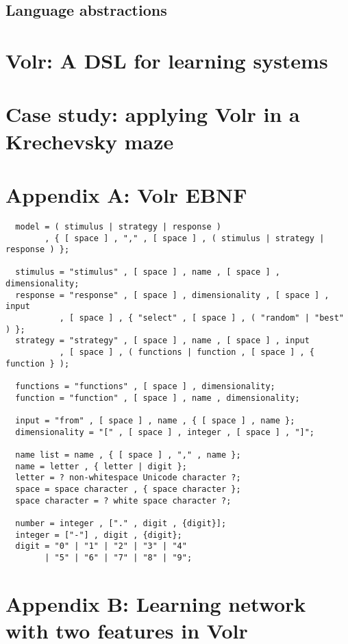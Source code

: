 \documentclass[a4paper,oneside]{memoir}
\begin{document}
\subsection{Language abstractions}

\section{Volr: A DSL for learning systems}
\label{volr}

\section{Case study: applying Volr in a Krechevsky maze}
\label{case}

\clearpage

\printglossary

\printbibliography

\section{Appendix A: Volr EBNF}
\label{ebnf}

\begin{verbatim}
  model = ( stimulus | strategy | response )
        , { [ space ] , "," , [ space ] , ( stimulus | strategy | response ) };

  stimulus = "stimulus" , [ space ] , name , [ space ] , dimensionality;
  response = "response" , [ space ] , dimensionality , [ space ] , input
           , [ space ] , { "select" , [ space ] , ( "random" | "best" ) };
  strategy = "strategy" , [ space ] , name , [ space ] , input
           , [ space ] , ( functions | function , [ space ] , { function } );

  functions = "functions" , [ space ] , dimensionality;
  function = "function" , [ space ] , name , dimensionality;

  input = "from" , [ space ] , name , { [ space ] , name };
  dimensionality = "[" , [ space ] , integer , [ space ] , "]";

  name list = name , { [ space ] , "," , name };
  name = letter , { letter | digit };
  letter = ? non-whitespace Unicode character ?;
  space = space character , { space character };
  space character = ? white space character ?;

  number = integer , ["." , digit , {digit}];
  integer = ["-"] , digit , {digit};
  digit = "0" | "1" | "2" | "3" | "4"
        | "5" | "6" | "7" | "8" | "9";
\end{verbatim}

\section{Appendix B: Learning network with two features in Volr}


\end{document}
